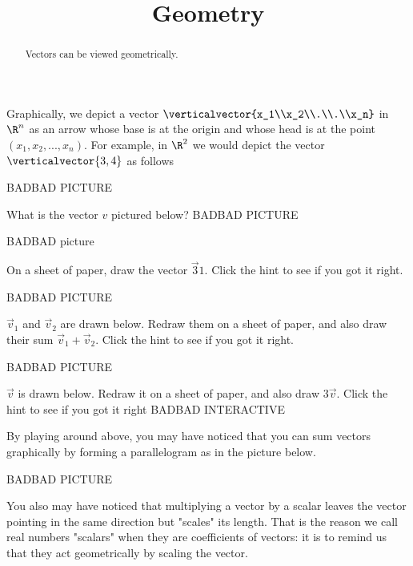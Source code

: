 \documentclass{ximera}
\title{Geometry}
\begin{document}
\begin{abstract}
  Vectors can be viewed geometrically.
\end{abstract}

	Graphically, we depict a vector $\verticalvector{x_1\\x_2\\.\\.\\x_n}$ in $\R^n$ as an arrow whose base is at the origin and whose head is at  the point $(x_1,x_2,...,x_n)$.  
	For example, in $\R^2$ we would depict the vector $\verticalvector{3,4}$ as follows
 	 
 	 BADBAD PICTURE
 	 
 	 \begin{question}
 	 	What is the vector $v$ pictured below?
 	 	BADBAD PICTURE
  	 \end{question}
  	 
  	 \begin{question}
  	 	\begin{hint}
  	 		BADBAD picture
  	 	\end{hint}
  	 	On a sheet of paper, draw the vector $\vec{3}{1}$. Click the hint to see if you got it right.
  	 \end{question}
  	 
  	 \begin{question}
  	 \begin{hint}
  	 	BADBAD PICTURE
  	 \end{hint}
  	 	 $\vec{v}_1$ and $\vec{v}_2$ are drawn below.  Redraw them on a sheet of paper, and also draw their sum $\vec{v}_1+\vec{v}_2$.
  	 	 Click the hint to see if you got it right.
  	 	
  	 \end{question}
  	 
  	 \begin{question}
  	 \begin{hint}
  	 BADBAD PICTURE
  	 \end{hint}
  	 	$\vec{v}$ is drawn below.  Redraw it on a sheet of paper, and also draw $3\vec{v}$.  Click the hint to see if you got it right
  	 	BADBAD INTERACTIVE
  	 \end{question}
  	 
  	 
  		By playing around above, you may have noticed that you can sum vectors graphically by forming a parallelogram as in the picture below.
  		
  		BADBAD PICTURE
  		
  		You also may have noticed that multiplying a vector by a scalar leaves the vector pointing in the same direction but "scales" its length.  That is the reason we call real
  		numbers  "scalars" when they are coefficients of vectors:  it is to remind us that they act geometrically by scaling the vector.
  		
\end{document}
